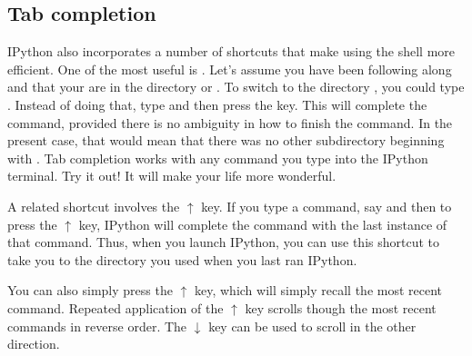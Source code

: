 \documentclass[letterpaper,10pt,english]{sphinxmanual}
\begin{document}
\subsection{Tab completion}
\label{\detokenize{chap2/chap2_basics:tab-completion}}\label{\detokenize{chap2/chap2_basics:index-8}}
\sphinxAtStartPar
IPython also incorporates a number of shortcuts that make using the shell more efficient.  One of the most useful is .  Let’s assume you have been following along and that your are in the directory   or .  To switch to the directory , you could type .  Instead of doing that, type  and then press the  key.  This will complete the command, provided there is no ambiguity in how to finish the command.  In the present case, that would mean that there was no other subdirectory beginning with .  Tab completion works with any command you type into the IPython terminal.  Try it out!  It will make your life more wonderful.

\sphinxAtStartPar
A related shortcut involves the \(\uparrow\) key.  If you type a command, say  and then to press the \(\uparrow\) key, IPython will complete the  command with the last instance of that command.  Thus, when you launch IPython, you can use this shortcut to take you to the directory you used when you last ran IPython.

\sphinxAtStartPar
You can also simply press the \(\uparrow\) key, which will simply recall the most recent command.  Repeated application of the \(\uparrow\) key scrolls though the most recent commands in reverse order.  The \(\downarrow\) key can be used to scroll in the other direction.
\end{document}

